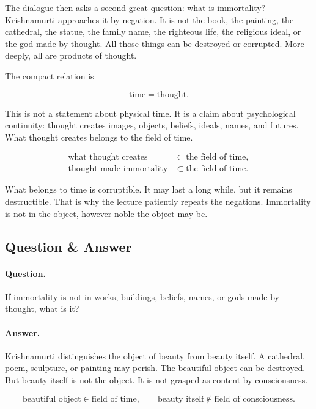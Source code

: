 The dialogue then asks a second great question: what is immortality? Krishnamurti approaches it by negation. It is not the book, the painting, the cathedral, the statue, the family name, the righteous life, the religious ideal, or the god made by thought. All those things can be destroyed or corrupted. More deeply, all are products of thought.

The compact relation is

\begin{equation}
\text{time} = \text{thought}.
\end{equation}

This is not a statement about physical time. It is a claim about psychological continuity: thought creates images, objects, beliefs, ideals, names, and futures. What thought creates belongs to the field of time.

\begin{align}
\text{what thought creates} &\subset \text{the field of time}, \\
\text{thought-made immortality} &\subset \text{the field of time}.
\end{align}

What belongs to time is corruptible. It may last a long while, but it remains destructible. That is why the lecture patiently repeats the negations. Immortality is not in the object, however noble the object may be.

\subsection{Question \& Answer}

\paragraph{Question.}
If immortality is not in works, buildings, beliefs, names, or gods made by thought, what is it?

\paragraph{Answer.}
Krishnamurti distinguishes the object of beauty from beauty itself. A cathedral, poem, sculpture, or painting may perish. The beautiful object can be destroyed. But beauty itself is not the object. It is not grasped as content by consciousness.

\begin{equation}
\text{beautiful object} \in \text{field of time},
\qquad
\text{beauty itself} \notin \text{field of consciousness}.
\end{equation}

